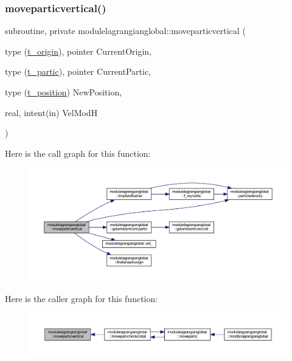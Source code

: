 \subsubsection{\texorpdfstring{moveparticvertical()}{moveparticvertical()}}
{\footnotesize\ttfamily subroutine, private modulelagrangianglobal\+::moveparticvertical (\begin{DoxyParamCaption}\item[{type (\mbox{\hyperlink{structmodulelagrangianglobal_1_1t__origin}{t\+\_\+origin}}), pointer}]{Current\+Origin,  }\item[{type (\mbox{\hyperlink{structmodulelagrangianglobal_1_1t__partic}{t\+\_\+partic}}), pointer}]{Current\+Partic,  }\item[{type (\mbox{\hyperlink{structmodulelagrangianglobal_1_1t__position}{t\+\_\+position}})}]{New\+Position,  }\item[{real, intent(in)}]{Vel\+ModH }\end{DoxyParamCaption})\hspace{0.3cm}{\ttfamily [private]}}

Here is the call graph for this function\+:\nopagebreak
\begin{figure}[H]
\begin{center}
\leavevmode
\includegraphics[width=350pt]{namespacemodulelagrangianglobal_abff124f5f5744390bce7f4e2ca7b33a4_cgraph}
\end{center}
\end{figure}
Here is the caller graph for this function\+:\nopagebreak
\begin{figure}[H]
\begin{center}
\leavevmode
\includegraphics[width=350pt]{namespacemodulelagrangianglobal_abff124f5f5744390bce7f4e2ca7b33a4_icgraph}
\end{center}
\end{figure}
\mbox{\label{namespacemodulelagrangianglobal_aefd30b6e40fc0d2152594e910c0c05de}} 
